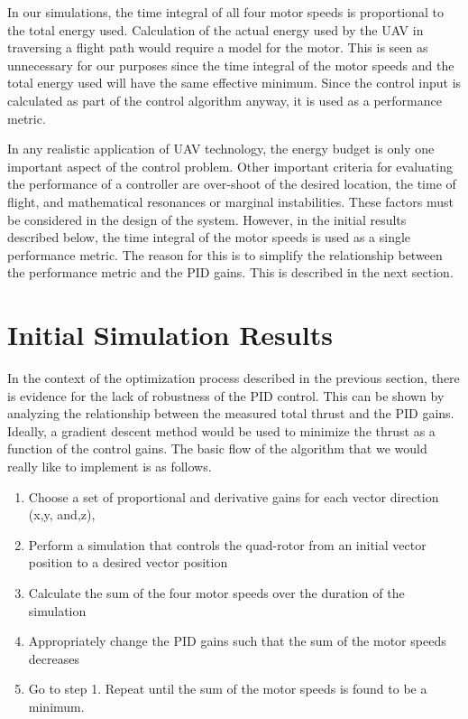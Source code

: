 In our simulations, the time integral of all four motor speeds is proportional to the total energy used. Calculation of the actual energy used by the UAV in traversing a flight path would require a model for the motor. This is seen as unnecessary for our purposes since the time integral of the motor speeds and the total energy used will have the same effective minimum. Since the control input is calculated as part of the control algorithm anyway, it is used as a performance metric.


In any realistic application of UAV technology, the energy budget is only one important aspect of the control problem. Other important criteria for evaluating the performance of a controller are over-shoot of the desired location, the time of flight, and mathematical resonances or marginal instabilities. These factors must be considered in the design of the system. However, in the initial results described below, the time integral of the motor speeds is used as a single performance metric. The reason for this is to simplify the relationship between the performance metric and the PID gains. This is described in the next section.


\section{Initial Simulation Results}

In the context of the optimization process described in the previous section, there is evidence for the lack of robustness of the PID control. This can be shown by analyzing the relationship between the measured total thrust and the PID gains. Ideally, a gradient descent method would be used to minimize the thrust as a function of the control gains. The basic flow of the algorithm that we would really like to implement is as follows.


\begin{enumerate}
\item Choose a set of proportional and derivative gains for each vector direction (x,y, and,z),
\item Perform a simulation that controls the quad-rotor from an initial vector position to a desired vector position  
\item Calculate the sum of the four motor speeds over the duration of the simulation
\item Appropriately change the PID gains such that the sum of the motor speeds decreases
\item Go to step 1. Repeat until the sum of the motor speeds is found to be a minimum.
\end{enumerate}

